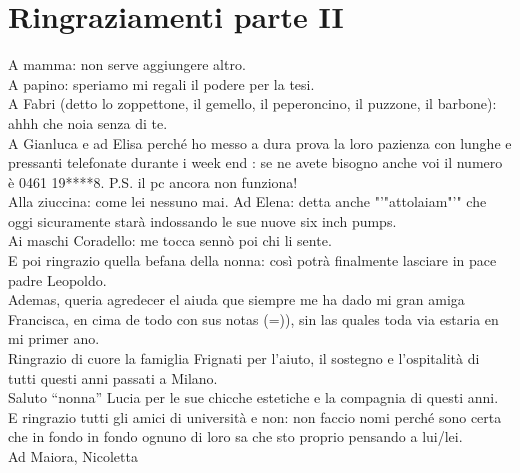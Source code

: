 \chapter*{Ringraziamenti parte II}
A mamma: non serve aggiungere altro.
\vspace{10pt}\\
A papino: speriamo mi regali il podere per la tesi.
\vspace{10pt}\\
A Fabri (detto lo zoppettone, il gemello, il peperoncino, il puzzone, il barbone): ahhh che noia senza di te.
\vspace{10pt}\\
A Gianluca e ad Elisa perché ho messo a dura prova la loro pazienza con lunghe e pressanti telefonate durante i week end : se ne avete bisogno anche voi il numero è 0461 19****8. P.S. il pc ancora non funziona!
\vspace{10pt}\\
Alla ziuccina: come lei nessuno mai.
\newline
\newline
Ad Elena: detta anche "'"attolaiam"'" che oggi sicuramente starà indossando le sue nuove six inch pumps.
\vspace{10pt}\\
Ai maschi Coradello: me tocca sennò poi chi li sente.
\vspace{10pt}\\
E poi ringrazio quella befana della nonna: così potrà finalmente lasciare in pace padre Leopoldo. 
\vspace{10pt}\\
Ademas, queria agredecer el aiuda que siempre me ha dado mi gran amiga Francisca, en cima de todo con sus notas (=)), sin las quales toda via estaria en mi primer ano.
\vspace{10pt}\\
Ringrazio di cuore la famiglia Frignati per l'aiuto, il sostegno e l'ospitalità di tutti questi anni passati a Milano.
\vspace{10pt}\\
Saluto ``nonna'' Lucia per le sue chicche estetiche e la compagnia di questi anni.
\vspace{10pt}\\
E ringrazio tutti gli amici di università e non: non faccio nomi perché sono certa che in fondo in fondo ognuno di loro sa che sto proprio pensando a lui/lei.
\vspace{30pt}\\
Ad Maiora,  Nicoletta
